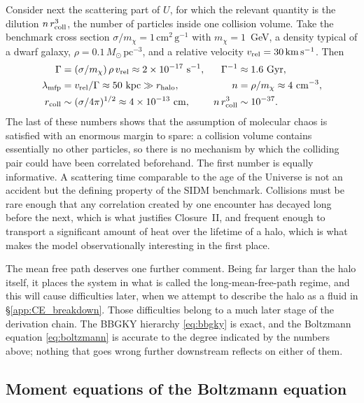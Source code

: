 \documentclass[12pt]{article}
\newcommand{\cmg}{\,\mathrm{cm^2\,g^{-1}}}
\newcommand{\kms}{\,\mathrm{km\,s^{-1}}}
\newcommand{\Msun}{\,M_\odot}
\newcommand{\smx}{\sigma/m_\chi}
\newcommand{\vrel}{v_{\rm rel}}
\newcommand{\mfp}{\lambda_{\rm mfp}}
\begin{document}
Consider next the scattering part of $U$, for which the relevant
quantity is the dilution $n\,r_{\rm coll}^3$, the number of particles
inside one collision volume.  Take the benchmark cross section
$\smx = 1\cmg$ with $m_\chi = 1$~GeV, a density typical of a dwarf
galaxy, $\rho = 0.1\Msun\,\mathrm{pc^{-3}}$, and a relative velocity
$\vrel = 30\kms$.  Then
%
\begin{align}
  \Gamma &= (\smx)\,\rho\,\vrel \approx 2\times10^{-17}\ \mathrm{s^{-1}},
    &\Gamma^{-1} &\approx 1.6\ \mathrm{Gyr},
    \label{eq:sidm_rate_estimate}\\
  \mfp &= \vrel/\Gamma \approx 50\ \mathrm{kpc} \gg r_{\rm halo},
    &n &= \rho/m_\chi \approx 4\ \mathrm{cm^{-3}},\\
  r_{\rm coll} &\sim (\sigma/4\pi)^{1/2} \approx 4\times10^{-13}\ \mathrm{cm},
    &n\,r_{\rm coll}^3 &\sim 10^{-37}.
\end{align}
%
The last of these numbers shows that the assumption of molecular chaos
is satisfied with an enormous margin to spare: a collision volume
contains essentially no other particles, so there is no mechanism by
which the colliding pair could have been correlated beforehand.  The
first number is equally informative.  A scattering time comparable to
the age of the Universe is not an accident but the defining property of
the SIDM benchmark.  Collisions must be rare enough that any
correlation created by one encounter has decayed long before the next,
which is what justifies Closure~II, and frequent enough to transport a
significant amount of heat over the lifetime of a halo, which is what
makes the model observationally interesting in the first place.

The mean free path deserves one further comment.  Being far larger than
the halo itself, it places the system in what is called the
long-mean-free-path regime, and this will cause difficulties later,
when we attempt to describe the halo as a fluid in
\S\ref{app:CE_breakdown}.  Those difficulties belong to a much later
stage of the derivation chain.  The BBGKY hierarchy \eqref{eq:bbgky} is
exact, and the Boltzmann equation \eqref{eq:boltzmann} is accurate to
the degree indicated by the numbers above; nothing that goes wrong
further downstream reflects on either of them.

\subsection{Moment equations of the Boltzmann equation}
\label{app:moments}
\end{document}
